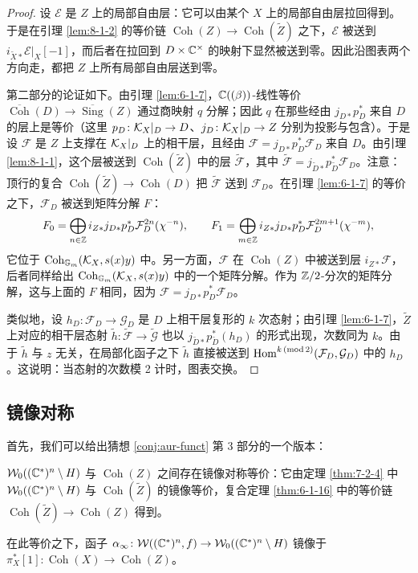 \begin{proof}
设 $\mathcal E$ 是 $Z$ 上的局部自由层：它可以由某个 $X$ 上的局部自由层拉回得到。于是在引理 \ref{lem:8-1-2} 的等价链 $\operatorname{Coh}(Z)\to\operatorname{Coh}(\tilde Z)$ 之下，$\mathcal E$ 被送到 $i_{\tilde X*}\mathcal E|_X[-1]$，而后者在拉回到 $D\times\mathbb{C}^\times$ 的映射下显然被送到零。因此沿图表两个方向走，都把 $Z$ 上所有局部自由层送到零。

第二部分的论证如下。由引理 \ref{lem:6-1-7}，$\mathbb{C}((\beta))$-线性等价 $\overline{\operatorname{Coh}}(D)\to\overline{\operatorname{Sing}}(Z)$ 通过商映射 $q$ 分解；因此 $q$ 在那些经由 $j_{D*}p_D^*$ 来自 $D$ 的层上是等价（这里 $p_D\colon\mathcal{K}_X|_D\to D$、$j_D\colon\mathcal{K}_X|_D\to Z$ 分别为投影与包含）。于是设 $\mathcal F$ 是 $Z$ 上支撑在 $\mathcal{K}_X|_D$ 上的相干层，且经由 $\mathcal F=j_{D*}p_D^*\mathcal F_D$ 来自 $D$。由引理 \ref{lem:8-1-1}，这个层被送到 $\operatorname{Coh}(\tilde Z)$ 中的层 $\tilde{\mathcal F}$，其中 $\tilde{\mathcal F}=j_{\tilde D*}p_{\tilde D}^*\mathcal F_D$。注意：顶行的复合 $\operatorname{Coh}(\tilde Z)\to\operatorname{Coh}(D)$ 把 $\tilde{\mathcal F}$ 送到 $\mathcal F_D$。在引理 \ref{lem:6-1-7} 的等价之下，$\mathcal F_D$ 被送到矩阵分解 $F$：
\[
F_0=\bigoplus_{n\in\mathbb{Z}}i_{Z*}j_{D*}p_D^*\mathcal{F}_D^{2n}(\chi^{-n}),\qquad
F_1=\bigoplus_{m\in\mathbb{Z}}i_{Z*}j_{D*}p_D^*\mathcal{F}_D^{2m+1}(\chi^{-m}),
\]
它位于 $\operatorname{Coh}_{\mathbb G_m}(\mathcal{K}_X,s(x)y)$ 中。另一方面，$\mathcal F$ 在 $\operatorname{Coh}(Z)$ 中被送到层 $i_{Z*}\mathcal F$，后者同样给出 $\operatorname{Coh}_{\mathbb G_m}(\mathcal{K}_X,s(x)y)$ 中的一个矩阵分解。作为 $\mathbb{Z}/2$-分次的矩阵分解，这与上面的 $F$ 相同，因为 $\mathcal F=j_{D*}p_D^*\mathcal F_D$。

类似地，设 $h_D\colon\mathcal F_D\to\mathcal G_D$ 是 $D$ 上相干层复形的 $k$ 次态射；由引理 \ref{lem:6-1-7}，$\tilde Z$ 上对应的相干层态射 $\tilde h\colon\tilde{\mathcal F}\to\tilde{\mathcal G}$ 也以 $j_{\tilde D*}p_{\tilde D}^*(h_D)$ 的形式出现，次数同为 $k$。由于 $\tilde h$ 与 $z$ 无关，在局部化函子之下 $\tilde h$ 直接被送到 $\operatorname{Hom}^{k\,(\mathrm{mod}\,2)}(\mathcal F_D,\mathcal G_D)$ 中的 $h_D$。这说明：当态射的次数模 2 计时，图表交换。
\end{proof}

\subsection{镜像对称}

首先，我们可以给出猜想 \ref{conj:aur-funct} 第 3 部分的一个版本：

\begin{theorem}\label{thm:8-2-1}
$\mathcal{W}_0((\mathbb{C}^*)^n\setminus H)$ 与 $\operatorname{Coh}(Z)$ 之间存在镜像对称等价：它由定理 \ref{thm:7-2-4} 中 $\mathcal{W}_0((\mathbb{C}^*)^n\setminus H)$ 与 $\operatorname{Coh}(\tilde Z)$ 的镜像等价，复合定理 \ref{thm:6-1-16} 中的等价链 $\operatorname{Coh}(\tilde Z)\to\operatorname{Coh}(Z)$ 得到。

在此等价之下，函子 $\alpha_\infty\colon\mathcal{W}((\mathbb{C}^*)^n,f)\to\mathcal{W}_0((\mathbb{C}^*)^n\setminus H)$ 镜像于 $\pi_X^*[1]\colon\operatorname{Coh}(X)\to\operatorname{Coh}(Z)$。
\end{theorem}

